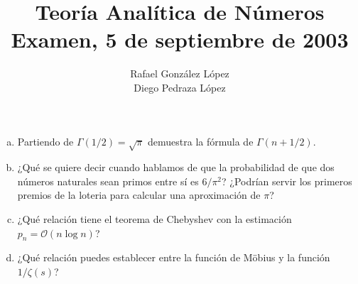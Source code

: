 \documentclass[twoside]{article}
\begin{document}
\title{Teoría Analítica de Números\\Examen, 5 de septiembre de 2003}
\author{Rafael González López\\Diego Pedraza López}
\maketitle

\begin{ejercicio}{1}
\begin{enumerate}[(a)]
	\item Partiendo de $Γ(1/2)=\sqrt{π}$ demuestra la fórmula de $Γ(n+1/2)$.
	\item ¿Qué se quiere decir cuando hablamos de que la probabilidad de que dos números naturales sean primos entre sí es $6/π^2$? ¿Podrían servir los primeros premios de la loteria para calcular una aproximación de $π$?
	\item ¿Qué relación tiene el teorema de Chebyshev con la estimación $p_n = \mathcal{O}(n \log n)$?
	\item ¿Qué relación puedes establecer entre la función de Möbius y la función $1/ζ(s)$?
\end{enumerate}
\end{ejercicio}
\end{document}
